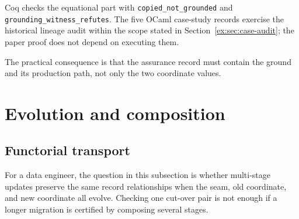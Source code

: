 \documentclass[11pt]{article}
\theoremstyle{definition}
\newcommand{\code}[1]{\texttt{#1}}
\begin{document}
Coq checks the equational part with \code{copied\_\allowbreak not\_\allowbreak grounded} and \code{grounding\_\allowbreak witness\_\allowbreak refutes}. The five OCaml case-study records exercise the historical lineage audit within the scope stated in Section~\ref{ex:sec:case-audit}; the paper proof does not depend on executing them.

The practical consequence is that the assurance record must contain the ground and its production path, not only the two coordinate values.

\section{Evolution and composition}\label{ex:sec:evolution}

\subsection{Functorial transport}\label{ex:sec:functorial-transport}

For a data engineer, the question in this subsection is whether multi-stage updates preserve the same record relationships when the seam, old coordinate, and new coordinate all evolve. Checking one cut-over pair is not enough if a longer migration is certified by composing several stages.
\end{document}
